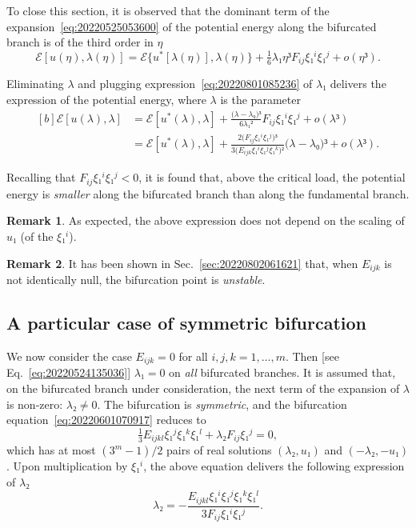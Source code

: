 \documentclass[12pt, final]{scrartcl}
\theoremstyle{definition}
\newtheorem{remark}{Remark}
\begin{document}
To close this section, it is observed that the dominant term of the
expansion~\eqref{eq:20220525053600} of the potential energy along the bifurcated
branch is of the third order in \(η\)
\begin{equation}
  ℰ[u(η), λ(η)] = ℰ\{u^{\ast}[λ(η)], λ(η)\} + \tfrac{1}{6} λ₁ η³ F_{i j} ξ₁^i ξ₁^j + o(η³).
\end{equation}

Eliminating \(λ\) and plugging expression~\eqref{eq:20220801085236} of \(λ₁\)
delivers the expression of the potential energy, where \(λ\) is the parameter
\begin{equation}
  \begin{aligned}[b]
    ℰ[u(λ), λ] &= ℰ[u^{\ast}(λ), λ] + \frac{\bigl(λ - λ₀\bigr)³}{6λ₁²} F_{i j} ξ₁^i ξ₁^j + o(λ³)\\
    &= ℰ[u^{\ast}(λ), λ] + \frac{2 \bigl( F_{i j} ξ₁^i ξ₁^j \bigr)³}{3 \bigl( E_{ijk} ξ₁^i ξ₁^j ξ₁^k \bigr)²} \bigl(λ - λ₀\bigr)³ + o(λ³).
  \end{aligned}
\end{equation}

Recalling that \(F_{i j} ξ₁^i ξ₁^j < 0\), it is found that, above the critical
load, the potential energy is \emph{smaller} along the bifurcated branch than
along the fundamental branch.

\begin{remark}
  As expected, the above expression does not depend on the scaling of \(u₁\) (of the \(ξ₁^i\)).
\end{remark}
\begin{remark}
  It has been shown in Sec.~\ref{sec:20220802061621} that, when \(E_{ijk}\) is
  not identically null, the bifurcation point is \emph{unstable}.
\end{remark}

\subsection{A particular case of symmetric bifurcation}

We now consider the case \(E_{ijk}=0\) for all \(i, j, k = 1, \ldots, m\). Then
[see Eq.~\eqref{eq:20220524135036}] \(λ₁ = 0\) on \emph{all} bifurcated
branches. It is assumed that, on the bifurcated branch under consideration, the
next term of the expansion of \(λ\) is non-zero: \(λ₂ ≠ 0\). The bifurcation is
\emph{symmetric}, and the bifurcation equation~\eqref{eq:20220601070917} reduces
to
\begin{equation}
  \label{eq:20220801092222}
  \tfrac{1}{3} E_{ijkl} ξ₁^j ξ₁^k ξ₁^l  + λ₂ F_{ij} ξ₁^j = 0,
\end{equation}
which has at most \((3^m - 1) / 2\) pairs of real solutions \((λ₂, u₁)\) and
\((- λ₂, - u₁)\). Upon multiplication by \(ξ₁^i\), the above equation delivers
the following expression of \(λ₂\)
\begin{equation}
  \label{eq:20220801093236}
  λ₂ = -\frac{E_{ijkl} ξ₁^i ξ₁^j ξ₁^k ξ₁^l}{3 F_{ij} ξ₁^i ξ₁^j}.
\end{equation}
\end{document}
